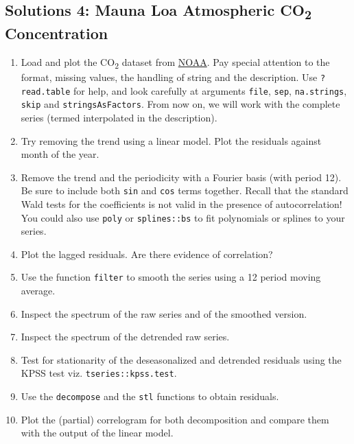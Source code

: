 \documentclass[]{book}
\providecommand{\tightlist}{%
  \setlength{\itemsep}{0pt}\setlength{\parskip}{0pt}}
\begin{document}
\hypertarget{solutions-4-mauna-loa-atmospheric-co2-concentration}{%
\subsection{\texorpdfstring{Solutions 4: Mauna Loa Atmospheric
CO\textsubscript{2}
Concentration}{Solutions 4: Mauna Loa Atmospheric CO2 Concentration}}\label{solutions-4-mauna-loa-atmospheric-co2-concentration}}

\begin{enumerate}
\def\labelenumi{\arabic{enumi}.}
\tightlist
\item
  Load and plot the CO\textsubscript{2} dataset from
  \href{ftp://aftp.cmdl.noaa.gov/products/trends/co2/co2_mm_mlo.txt}{NOAA}.
  Pay special attention to the format, missing values, the handling of
  string and the description. Use \texttt{?read.table} for help, and
  look carefully at arguments \texttt{file}, \texttt{sep},
  \texttt{na.strings}, \texttt{skip} and \texttt{stringsAsFactors}. From
  now on, we will work with the complete series (termed interpolated in
  the description).
\item
  Try removing the trend using a linear model. Plot the residuals
  against month of the year.
\item
  Remove the trend and the periodicity with a Fourier basis (with period
  12). Be sure to include both \texttt{sin} and \texttt{cos} terms
  together. Recall that the standard Wald tests for the coefficients is
  not valid in the presence of autocorrelation! You could also use
  \texttt{poly} or \texttt{splines::bs} to fit polynomials or splines to
  your series.
\item
  Plot the lagged residuals. Are there evidence of correlation?
\item
  Use the function \texttt{filter} to smooth the series using a 12
  period moving average.
\item
  Inspect the spectrum of the raw series and of the smoothed version.
\item
  Inspect the spectrum of the detrended raw series.
\item
  Test for stationarity of the deseasonalized and detrended residuals
  using the KPSS test viz. \texttt{tseries::kpss.test}.
\item
  Use the \texttt{decompose} and the \texttt{stl} functions to obtain
  residuals.
\item
  Plot the (partial) correlogram for both decomposition and compare them
  with the output of the linear model.
\end{enumerate}
\end{document}
